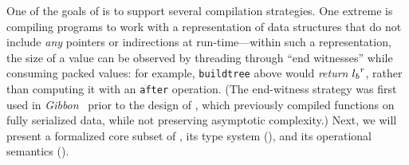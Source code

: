 %

{One of the goals of \ourcalc{} is to support several compilation
  strategies. One extreme is compiling programs to work with a representation of
  data structures that do not include \emph{any} pointers or indirections at
  run-time---within such a representation, the size of a value can be observed
  by threading through ``end witnesses'' while consuming packed values: for
  example, \lstinline[mathescape]{buildtree} above would \emph{return} ${l_b}^{r}$, rather than computing
  it with an \lstinline[mathescape]{after} operation.
  (The end-witness strategy was first used in
  {\em Gibbon}~\cite{ecoop17-gibbon} prior to the design of \ourcalc{},
  which previously compiled functions on fully serialized data,
  while not preserving asymptotic complexity.)
}
%
%
%
%
Next, we will present a formalized core subset of \ourcalc,
its type system (),
and its operational semantics ().

